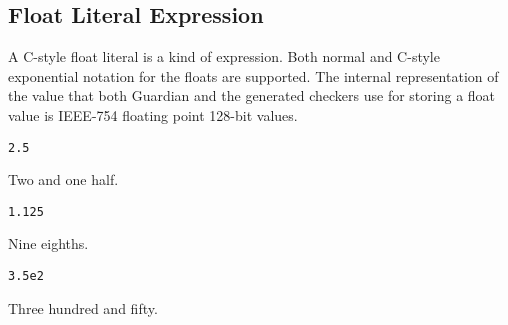 
\subsection{Float Literal Expression}
{
	A C-style float literal is a kind of expression.
	Both normal and C-style exponential notation for the floats are supported.
	The internal representation of the value that both Guardian and the
	generated checkers use for storing a float value is IEEE-754 floating point
	128-bit values.
	
	\begin{itemize}
	{
		\item[] \texttt{2.5}
		
			Two and one half.
		
		\item[] \texttt{1.125}
		
			Nine eighths.
		
		\item[] \texttt{3.5e2}
		
			Three hundred and fifty.
	}
	\end{itemize}
}
